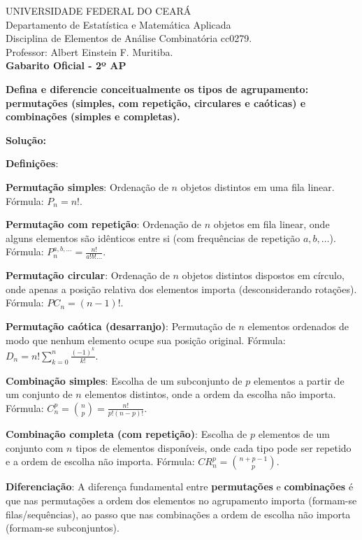 \documentclass[a4paper,10pt,landscape,twocolumn]{article}  %
\let\oldenumerate\enumerate
\let\oldendenumerate\endenumerate
\renewenvironment{enumerate}{%
  \oldenumerate%
  \setlength{\itemsep}{1pt}%
  \setlength{\parskip}{0pt}%
  \setlength{\parsep}{0pt}%
  \setlength{\topsep}{2pt}%
  \setlength{\partopsep}{0pt}%
}{%
  \oldendenumerate%
}
\let\olditemize\itemize
\let\oldenditemize\enditemize
\renewenvironment{itemize}{%
  \olditemize%
  \setlength{\itemsep}{1pt}%
  \setlength{\parskip}{0pt}%
  \setlength{\parsep}{0pt}%
  \setlength{\topsep}{2pt}%
  \setlength{\partopsep}{0pt}%
}{%
  \oldenditemize%
}
\begin{document}
\thispagestyle{empty}

UNIVERSIDADE FEDERAL DO CEARÁ\\
Departamento de Estatística e Matemática Aplicada\\
Disciplina de Elementos de Análise Combinatória cc0279.\\
Professor: Albert Einstein F. Muritiba.\\
\textbf{Gabarito Oficial - 2º AP} \\[0.2cm]

\begin{enumerate}
    \item \textbf{Defina e diferencie conceitualmente os tipos de agrupamento: permutações (simples, com repetição, circulares e caóticas) e combinações (simples e completas).}
    
    \textbf{Solução:}
    
    \begin{itemize}
        \item \textbf{Definições}:
        \begin{itemize}
            \item \textbf{Permutação simples}: Ordenação de $n$ objetos distintos em uma fila linear. Fórmula: $P_n = n!$.
            \item \textbf{Permutação com repetição}: Ordenação de $n$ objetos em fila linear, onde alguns elementos são idênticos entre si (com frequências de repetição $a, b, \dots$). Fórmula: $P_n^{a,b, \dots} = \frac{n!}{a!b!\dots}$.
            \item \textbf{Permutação circular}: Ordenação de $n$ objetos distintos dispostos em círculo, onde apenas a posição relativa dos elementos importa (desconsiderando rotações). Fórmula: $PC_n = (n-1)!$.
            \item \textbf{Permutação caótica (desarranjo)}: Permutação de $n$ elementos ordenados de modo que nenhum elemento ocupe sua posição original. Fórmula: $D_n = n! \sum_{k=0}^n \frac{(-1)^k}{k!}$.
            \item \textbf{Combinação simples}: Escolha de um subconjunto de $p$ elementos a partir de um conjunto de $n$ elementos distintos, onde a ordem da escolha não importa. Fórmula: $C_n^p = \binom{n}{p} = \frac{n!}{p!(n-p)!}$.
            \item \textbf{Combinação completa (com repetição)}: Escolha de $p$ elementos de um conjunto com $n$ tipos de elementos disponíveis, onde cada tipo pode ser repetido e a ordem de escolha não importa. Fórmula: $CR_n^p = \binom{n+p-1}{p}$.
        \end{itemize}
        \item \textbf{Diferenciação}: 
        A diferença fundamental entre \textbf{permutações} e \textbf{combinações} é que nas permutações a ordem dos elementos no agrupamento importa (formam-se filas/sequências), ao passo que nas combinações a ordem de escolha não importa (formam-se subconjuntos).
    \end{itemize}


\end{enumerate}
\end{document}
